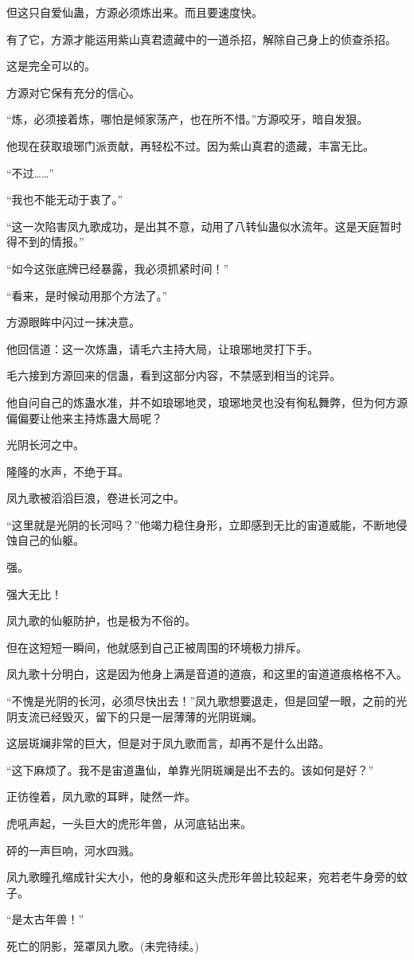 \begin{this_body}
但这只自爱仙蛊，方源必须炼出来。而且要速度快。

有了它，方源才能运用紫山真君遗藏中的一道杀招，解除自己身上的侦查杀招。

这是完全可以的。

方源对它保有充分的信心。

“炼，必须接着炼，哪怕是倾家荡产，也在所不惜。”方源咬牙，暗自发狠。

他现在获取琅琊门派贡献，再轻松不过。因为紫山真君的遗藏，丰富无比。

“不过……”

“我也不能无动于衷了。”

“这一次陷害凤九歌成功，是出其不意，动用了八转仙蛊似水流年。这是天庭暂时得不到的情报。”

“如今这张底牌已经暴露，我必须抓紧时间！”

“看来，是时候动用那个方法了。”

方源眼眸中闪过一抹决意。

他回信道：这一次炼蛊，请毛六主持大局，让琅琊地灵打下手。

毛六接到方源回来的信蛊，看到这部分内容，不禁感到相当的诧异。

他自问自己的炼蛊水准，并不如琅琊地灵，琅琊地灵也没有徇私舞弊，但为何方源偏偏要让他来主持炼蛊大局呢？

光阴长河之中。

隆隆的水声，不绝于耳。

凤九歌被滔滔巨浪，卷进长河之中。

“这里就是光阴的长河吗？”他竭力稳住身形，立即感到无比的宙道威能，不断地侵蚀自己的仙躯。

强。

强大无比！

凤九歌的仙躯防护，也是极为不俗的。

但在这短短一瞬间，他就感到自己正被周围的环境极力排斥。

凤九歌十分明白，这是因为他身上满是音道的道痕，和这里的宙道道痕格格不入。

“不愧是光阴的长河，必须尽快出去！”凤九歌想要退走，但是回望一眼，之前的光阴支流已经毁灭，留下的只是一层薄薄的光阴斑斓。

这层斑斓非常的巨大，但是对于凤九歌而言，却再不是什么出路。

“这下麻烦了。我不是宙道蛊仙，单靠光阴斑斓是出不去的。该如何是好？”

正彷徨着，凤九歌的耳畔，陡然一炸。

虎吼声起，一头巨大的虎形年兽，从河底钻出来。

砰的一声巨响，河水四溅。

凤九歌瞳孔缩成针尖大小，他的身躯和这头虎形年兽比较起来，宛若老牛身旁的蚊子。

“是太古年兽！”

死亡的阴影，笼罩凤九歌。(未完待续。)

\end{this_body}

